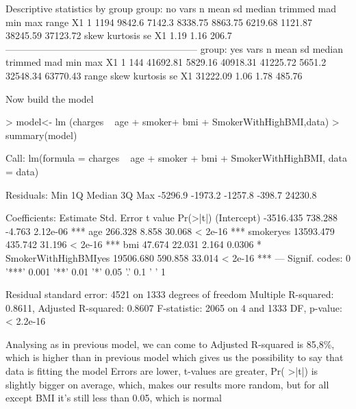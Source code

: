 \documentclass{article}
\begin{document}
\begin{Schunk}
\begin{Soutput}
 Descriptive statistics by group 
group: no
   vars    n   mean     sd  median trimmed     mad     min      max    range
X1    1 1194 9842.6 7142.3 8338.75 8863.75 6219.68 1121.87 38245.59 37123.72
   skew kurtosis    se
X1 1.19     1.16 206.7
------------------------------------------------------------ 
group: yes
   vars   n     mean      sd   median  trimmed    mad      min      max
X1    1 144 41692.81 5829.16 40918.31 41225.72 5651.2 32548.34 63770.43
      range skew kurtosis     se
X1 31222.09 1.06     1.78 485.76
\end{Soutput}
\end{Schunk}

Now build the model

\begin{Schunk}
\begin{Sinput}
> model<- lm (charges ~ age  + smoker+ bmi + SmokerWithHighBMI,data)
> summary(model)
\end{Sinput}
\begin{Soutput}
Call:
lm(formula = charges ~ age + smoker + bmi + SmokerWithHighBMI, 
    data = data)

Residuals:
    Min      1Q  Median      3Q     Max 
-5296.9 -1973.2 -1257.8  -398.7 24230.8 

Coefficients:
                      Estimate Std. Error t value Pr(>|t|)    
(Intercept)          -3516.435    738.288  -4.763 2.12e-06 ***
age                    266.328      8.858  30.068  < 2e-16 ***
smokeryes            13593.479    435.742  31.196  < 2e-16 ***
bmi                     47.674     22.031   2.164   0.0306 *  
SmokerWithHighBMIyes 19506.680    590.858  33.014  < 2e-16 ***
---
Signif. codes:  0 '***' 0.001 '**' 0.01 '*' 0.05 '.' 0.1 ' ' 1

Residual standard error: 4521 on 1333 degrees of freedom
Multiple R-squared:  0.8611,	Adjusted R-squared:  0.8607 
F-statistic:  2065 on 4 and 1333 DF,  p-value: < 2.2e-16
\end{Soutput}
\end{Schunk}

Analysing as in previous model, we can come to 
Adjusted R-squared is 85,8\%, which is higher than in previous model
which gives us the possibility to say that data is fitting the model
Errors are lower, t-values are greater, Pr( >|t|) is slightly bigger 
on average, which, makes our results more random, but for all
except BMI it's still less than 0.05, which is normal
\end{document}
